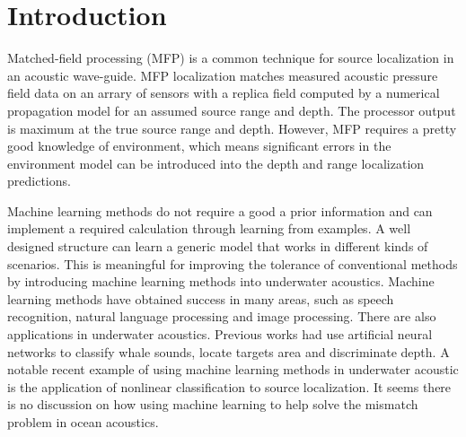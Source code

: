 \section{Introduction}
Matched-field processing (MFP) is a common technique for source localization in an acoustic
wave-guide\cite{bucker1976use,baggeroer1988matched,baggeroer1993overview}.
MFP localization matches measured acoustic pressure field data on an arrary of sensors with a replica field computed by a numerical propagation model for an assumed source range and depth. The processor output is maximum at the true source range and depth. However, MFP requires a pretty good knowledge of environment, which means significant errors in the environment model can be introduced into the
depth and range localization predictions.\cite{tolstoy1989sensitivity,del1988effects}

Machine learning methods do not require a good a prior information and can implement a required calculation through learning from examples. A well designed structure can learn a generic model that works in different kinds of scenarios. This is meaningful for improving the tolerance of conventional methods by introducing machine learning methods into underwater acoustics.
Machine learning  methods have obtained success in many areas, such as speech recognition, natural language processing and image processing. There are also applications in underwater acoustics.
Previous works had use artificial neural networks to classify whale sounds\cite{thode2012automated}, locate targets\cite{steinberg1991neural} area and discriminate depth\cite{ozard1991artificial}.
A notable recent example of using machine learning methods in underwater acoustic is the application of nonlinear classification to source localization\cite{niu2017source}. It seems there is no discussion on how using machine learning to help solve the mismatch problem in ocean acoustics.

